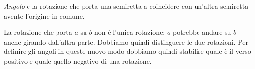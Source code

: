 \begin{definizione}
 \emph{Angolo} è la rotazione che porta una semiretta a coincidere con 
un'altra 
 semiretta avente l'origine in comune.
\end{definizione}

 \begin{minipage}[t]{.45\textwidth}
\begin{inaccessibleblock}
\begin{center}
 
\end{center}
\end{inaccessibleblock}
 \end{minipage}
 \begin{minipage}[t]{.45\textwidth}
\begin{inaccessibleblock}
\begin{center}
 
\end{center}
\end{inaccessibleblock}
 \end{minipage}

La rotazione che porta \(a\) su \(b\)  non è 
l'unica rotazione: \(a\) potrebbe andare su \(b\) anche girando dall'altra 
parte. Dobbiamo quindi distinguere le due 
rotazioni.
Per definire gli angoli in questo nuovo modo dobbiamo quindi stabilire quale 
è il verso positivo e quale quello negativo di una rotazione.

%     

